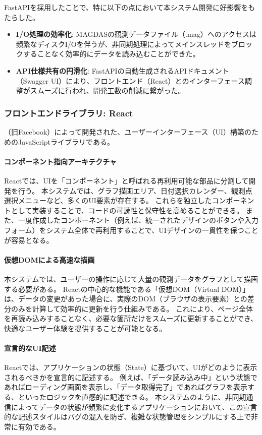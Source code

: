 FastAPIを採用したことで、特に以下の点において本システム開発に好影響をもたらした。

\begin{itemize}
    \item \textbf{I/O処理の効率化}: MAGDASの観測データファイル（.mag）へのアクセスは頻繁なディスクI/Oを伴うが、非同期処理によってメインスレッドをブロックすることなく効率的にデータを読み込むことができた。
    \item \textbf{API仕様共有の円滑化}: FastAPIの自動生成されるAPIドキュメント（Swagger UI）により、フロントエンド（React）とのインターフェース調整がスムーズに行われ、開発工数の削減に繋がった。
\end{itemize}

\subsubsection{フロントエンドライブラリ: React}

\cite{React}（旧Facebook）によって開発された、ユーザーインターフェース（UI）構築のためのJavaScriptライブラリである。

\paragraph{コンポーネント指向アーキテクチャ}

Reactでは、UIを「コンポーネント」と呼ばれる再利用可能な部品に分割して開発を行う。
本システムでは、グラフ描画エリア、日付選択カレンダー、観測点選択メニューなど、多くのUI要素が存在する。
これらを独立したコンポーネントとして実装することで、コードの可読性と保守性を高めることができる。
また、一度作成したコンポーネント（例えば、統一されたデザインのボタンや入力フォーム）をシステム全体で再利用することで、UIデザインの一貫性を保つことが容易となる。

\paragraph{仮想DOMによる高速な描画}

本システムでは、ユーザーの操作に応じて大量の観測データをグラフとして描画する必要がある。
Reactの中心的な機能である「仮想DOM（Virtual DOM）」は、データの変更があった場合に、実際のDOM（ブラウザの表示要素）との差分のみを計算して効率的に更新を行う仕組みである。
これにより、ページ全体を再読み込みすることなく、必要な箇所だけをスムーズに更新することができ、快適なユーザー体験を提供することが可能となる。

\paragraph{宣言的なUI記述}

Reactでは、アプリケーションの状態（State）に基づいて、UIがどのように表示されるべきかを宣言的に記述する。
例えば、「データ読み込み中」という状態であればローディング画面を表示し、「データ取得完了」であればグラフを表示する、といったロジックを直感的に記述できる。
本システムのように、非同期通信によってデータの状態が頻繁に変化するアプリケーションにおいて、この宣言的な記述スタイルはバグの混入を防ぎ、複雑な状態管理をシンプルにする上で非常に有効である。

